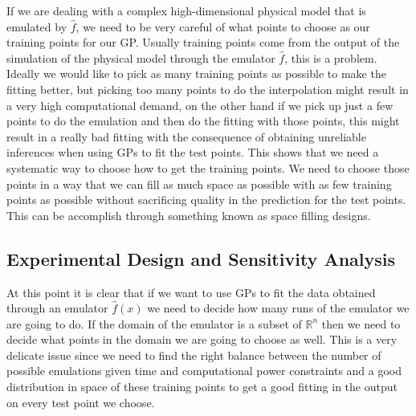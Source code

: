 \documentclass[12pt]{book}
\begin{document}
If we are dealing with a complex high-dimensional physical model
that is emulated by $\hat{f}$, we need to be very careful of what points to choose as our training points
for our GP. Usually training points come from the output of the simulation of the physical
model through the emulator $\hat{f}$, this is a problem. Ideally 
we would like to pick as many training points as possible to make the fitting better, but picking too many points
to do the interpolation might result in a very high computational demand, on the other hand if we pick up
just a few points to do the emulation and then do the fitting with those points, this might result in a really
bad fitting with the consequence of obtaining unreliable inferences when using GPs to fit the test points. This
shows that we need a systematic way to choose how to get the training points. We need to choose those points
in a way that we can fill as much space as possible with as few training points as possible without
sacrificing quality in the prediction for the test points. This can be accomplish
through  something known as  space filling designs. 
\newline


\subsection{Experimental Design and Sensitivity Analysis}

At this point it is clear that if we want to use GPs to fit the data obtained through an emulator 
$\hat{f}(x)$ we need to decide how many runs of the emulator we are going to do. If the domain of the
emulator is a subset of $\mathbb{R}^{n}$ then we need to decide what points in the domain we are going 
to choose as well. This is a very delicate issue since we need to find the right balance between
the number of possible emulations given time and computational power constraints
 and a good distribution in space of these training points to get a good
fitting in the output on   every test point we choose.
\newline
 
\end{document}
